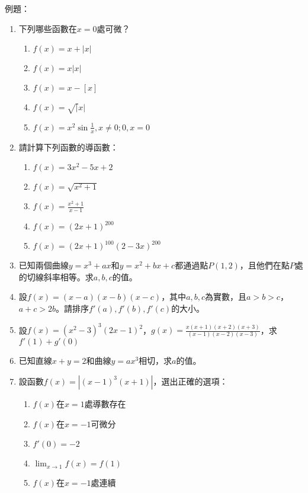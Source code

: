 \documentclass[12pt]{article}
\begin{document}
例題：
\begin{enumerate}
    \item 下列哪些函數在$x=0$處可微？
    \begin{enumerate}
        \item $f(x)=x+|x|$
        \item $f(x)=x|x|$
        \item $f(x)=x-[x]$
        \item $f(x)=\sqrt|x|$
        \item $f(x)=x^2\sin\frac{1}{x}, x\neq 0;0, x=0$
    \end{enumerate}
    \item 請計算下列函數的導函數：
    \begin{enumerate}
        \item $f(x) = 3x^2 - 5x + 2$\vspace{1.5cm}
        \item $f(x) = \sqrt{x^2+1}$\vspace{1.1cm}
        \item $f(x) = \frac{x^2 + 1}{x - 1}$\vspace{1.1cm}
        \item $f(x)=(2x+1)^{200}$\vspace{1.1cm}
        \item $f(x)=(2x+1)^{100}(2-3x)^{200}$\vspace{1.1cm}
    \end{enumerate}
    \item 已知兩個曲線$y=x^3+ax$和$y=x^2+bx+c$都通過點$P(1, 2)$，且他們在點$P$處的切線斜率相等。求$a, b, c$的值。\vspace{2.1cm}
    \item 設$f(x)=(x-a)(x-b)(x-c)$，其中$a, b, c$為實數，且$a>b>c$，$a+c>2b$。請排序$f'(a), f'(b), f'(c)$的大小。\vspace{2.1cm}
    \item 設$f(x)=(x^2-3)^3(2x-1)^2$，$g(x)=\frac{x(x+1)(x+2)(x+3)}{(x-1)(x-2)(x-3)}$，求$f'(1)+g'(0)$\vspace{2.1cm}
    \item 已知直線$x+y=2$和曲線$y=ax^3$相切，求$a$的值。\vspace{2cm}
    \item 設函數$f(x)=|(x-1)^3(x+1)|$，選出正確的選項：
    \begin{enumerate}
        \item $f(x)$在$x=1$處導數存在
        \item $f(x)$在$x=-1$可微分
        \item $f'(0)=-2$
        \item $\displaystyle\lim_{x\to 1}f(x)=f(1)$
        \item $f(x)$在$x=-1$處連續
    \end{enumerate}
\end{enumerate}
\end{document}
